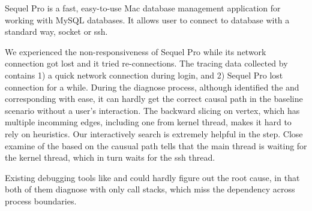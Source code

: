 Sequel Pro is a fast, easy-to-use Mac database management application for
working with MySQL databases. It allows user to connect to database with a
standard way, socket or ssh.

We experienced the non-responsiveness of Sequel Pro while its network connection
got lost and it tried re-connections. The tracing data collected by \xxx
contains 1) a quick network connection during login, and 2) Sequel Pro lost
connection for a while. During the diagnose process, although \xxx identified
the \spinningnode and corresponding \similarnode with ease, it can hardly get
the correct causal path in the baseline scenario without a user's interaction.
The backward slicing on vertex, which has multiple incomming edges, including
one from kernel thread, makes it hard to rely on heuristics. Our interactively
search is extremely helpful in the step. Close examine of the \spinningnode
based on the causual path tells that the main thread is waiting for the kernel
thread, which in turn waits for the ssh thread.


Existing debugging tools like  and  could hardly figure
out the root cause, in that both of them diagnose with only call stacks, which
miss the dependency across process boundaries.
